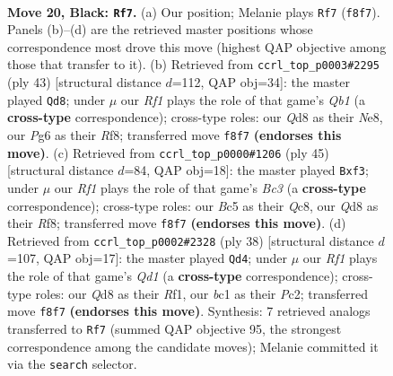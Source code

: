 \documentclass[11pt]{article}
\begin{document}
\clearpage

\begin{figure}[p]\centering
\begin{subfigure}{0.46\textwidth}\centering
\resizebox{\linewidth}{!}{%
\newchessgame
\chessboard[
  setfen={rn1q1r2/pp2k2R/4b1p1/2b1Q1P1/P7/2N2N2/1P3P2/R1B1KB2 b Q - 2 20},
  showmover=false,
  pgfstyle=straightmove, color=movearrow, markmove={f8-f7}
]}
\caption{}
\end{subfigure}\hfill
\begin{subfigure}{0.46\textwidth}\centering
\resizebox{\linewidth}{!}{%
\newchessgame
\chessboard[
  setfen={rq2nrk1/1p2ppbb/8/p2NP1Q1/8/P4N2/1P2BPPP/R5K1 b - - 0 22},
  showmover=false,
  pgfstyle=straightmove, color=movearrow, markmove={b8-d8}
]}
\caption{}
\end{subfigure}
\\[4pt]
\begin{subfigure}{0.46\textwidth}\centering
\resizebox{\linewidth}{!}{%
\newchessgame
\chessboard[
  setfen={1rq2rk1/4R1bp/p1b3p1/8/8/5N2/PP3PPP/R1B1Q1K1 b - - 0 23},
  showmover=false,
  pgfstyle=straightmove, color=movearrow, markmove={c6-f3}
]}
\caption{}
\end{subfigure}\hfill
\begin{subfigure}{0.46\textwidth}\centering
\resizebox{\linewidth}{!}{%
\newchessgame
\chessboard[
  setfen={b4rk1/4bp2/1q1p2pp/1N2n3/4P3/1N6/1PP1B1PP/3Q1R1K w - - 3 20},
  showmover=false,
  pgfstyle=straightmove, color=movearrow, markmove={d1-d4}
]}
\caption{}
\end{subfigure}
\caption{\textbf{Move 20, Black: \texttt{Rf7}.} (a) Our position; Melanie plays \texttt{Rf7} (\texttt{f8f7}). Panels (b)--(d) are the retrieved master positions whose correspondence most drove this move (highest QAP objective among those that transfer to it). (b) Retrieved from \texttt{ccrl\_top\_p0003\#2295} (ply 43) [structural distance $d$=112, QAP obj=34]: the master played \texttt{Qd8}; under $\mu$ our \emph{Rf1} plays the role of that game's \emph{Qb1} (a \textbf{cross-type} correspondence); cross-type roles: our \emph{Q}d8 as their \emph{N}e8, our \emph{P}g6 as their \emph{R}f8; transferred move \texttt{f8f7} \textbf{(endorses this move)}. (c) Retrieved from \texttt{ccrl\_top\_p0000\#1206} (ply 45) [structural distance $d$=84, QAP obj=18]: the master played \texttt{Bxf3}; under $\mu$ our \emph{Rf1} plays the role of that game's \emph{Bc3} (a \textbf{cross-type} correspondence); cross-type roles: our \emph{B}c5 as their \emph{Q}c8, our \emph{Q}d8 as their \emph{R}f8; transferred move \texttt{f8f7} \textbf{(endorses this move)}. (d) Retrieved from \texttt{ccrl\_top\_p0002\#2328} (ply 38) [structural distance $d$=107, QAP obj=17]: the master played \texttt{Qd4}; under $\mu$ our \emph{Rf1} plays the role of that game's \emph{Qd1} (a \textbf{cross-type} correspondence); cross-type roles: our \emph{Q}d8 as their \emph{R}f1, our \emph{b}c1 as their \emph{P}c2; transferred move \texttt{f8f7} \textbf{(endorses this move)}. Synthesis: 7 retrieved analogs transferred to \texttt{Rf7} (summed QAP objective 95, the strongest correspondence among the candidate moves); Melanie committed it via the \texttt{search} selector.}
\label{fig:thought-m39}
\end{figure}
\end{document}

